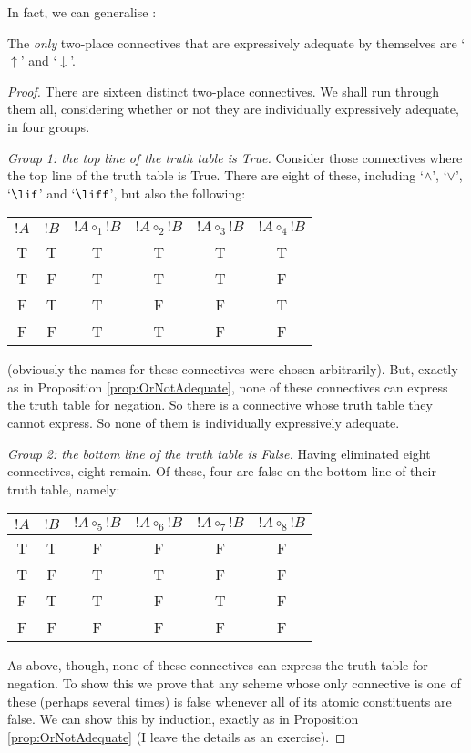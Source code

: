 \documentclass[../../../include/open-logic-section]{subfiles}
\begin{document}
In fact, we can generalise :
	\begin{thm}\label{thm:Ampheck}The \emph{only} two-place connectives that are expressively adequate by themselves are `$\uparrow$' and `$\downarrow$'. 
		\begin{proof}
			There are sixteen distinct two-place connectives. We shall run through them all, considering whether or not they are individually expressively adequate, in four groups. 
			
			\emph{Group 1: the top line of the truth table is True.} Consider those connectives where the top line of the truth table is True. There are eight of  these, including `$\land$', `$\lor$', `$\lif$' and `$\liff$', but also the following:
	\begin{center}
		\begin{tabular}{c c | c c c c}
		${!A}$ & ${!B}$ & ${!A} \mathrel{\circ_1} {!B}$ & ${!A} \mathrel{\circ_2} {!B}$ & ${!A} \mathrel{\circ_3} {!B}$ & ${!A} \mathrel{\circ_4} {!B}$\\
		\hline
			 T & T & T & T & T & T \\
			 T & F & T & T & T & F\\
			 F & T & T & F &  F & T \\
			 F & F & T & T & F & F
	\end{tabular}
	\end{center}
	(obviously the names for these connectives were chosen arbitrarily). But, exactly as in Proposition \ref{prop:OrNotAdequate}, none of these connectives can express the truth table for negation. So there is a connective whose truth table they cannot express. So none of them is individually expressively adequate.
				
			\emph{Group 2: the bottom line of the truth table is False.} Having eliminated eight connectives, eight remain. Of these, four are false on the bottom line of their truth table, namely:
	\begin{center}
		\begin{tabular}{c c | c c c c}
		${!A}$ & ${!B}$ & ${!A} \mathrel{\circ_5} {!B}$ & ${!A} \mathrel{\circ_6} {!B}$ & ${!A} \mathrel{\circ_7} {!B}$ & ${!A} \mathrel{\circ_8} {!B}$\\
		\hline
			 T & T & F & F & F & F \\
			 T & F & T & T & F & F\\
			 F & T & T & F &  T & F \\
			 F & F & F & F & F & F
	\end{tabular}
	\end{center}
	As above, though, none of these connectives can express the truth table for negation. To show this we prove that any scheme whose only connective is one of these (perhaps several times) is false whenever all of its atomic constituents are false. We can show this by induction, exactly as in Proposition \ref{prop:OrNotAdequate} (I leave the details as an exercise).
		

\end{proof}
\end{thm}
\end{document}
